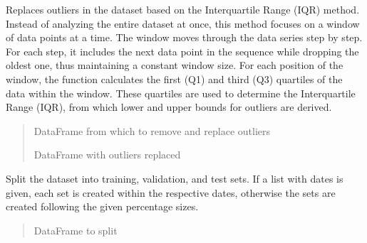 \documentclass[letterpaper,10pt,english]{sphinxmanual}
\begin{document}
\begin{fulllineitems}
\begin{fulllineitems}
\end{fulllineitems}


\begin{fulllineitems}
\label{\detokenize{docs/data_preprocessing:data_preprocessing.DataPreprocessor.replace_outliers}}
\pysigstartsignatures
{}
\pysigstopsignatures
\sphinxAtStartPar
Replaces outliers in the dataset based on the Interquartile Range (IQR)
method. Instead of analyzing the entire dataset at once, this method focuses on a window of data points at a time.
The window moves through the data series step by step. For each step, it includes the next data point
in the sequence while dropping the oldest one, thus maintaining a constant
window size. For each position of the window, the function calculates the
first (Q1) and third (Q3) quartiles of the data within the window. These
quartiles are used to determine the Interquartile Range (IQR), from which
lower and upper bounds for outliers are derived.
\begin{quote}\begin{description}
\sphinxAtStartPar
{} \textendash{} DataFrame from which to remove and replace outliers

\sphinxAtStartPar
DataFrame with outliers replaced

\end{description}\end{quote}

\end{fulllineitems}


\begin{fulllineitems}
\label{\detokenize{docs/data_preprocessing:data_preprocessing.DataPreprocessor.split_data}}
\pysigstartsignatures
{}
\pysigstopsignatures
\sphinxAtStartPar
Split the dataset into training, validation, and test sets.
If a list with dates is given, each set is created within the respective dates, otherwise the sets are created following
the given percentage sizes.
\begin{quote}\begin{description}
\sphinxAtStartPar
{} \textendash{} DataFrame to split


\end{description}
\end{quote}
\end{fulllineitems}
\end{fulllineitems}
\end{document}
